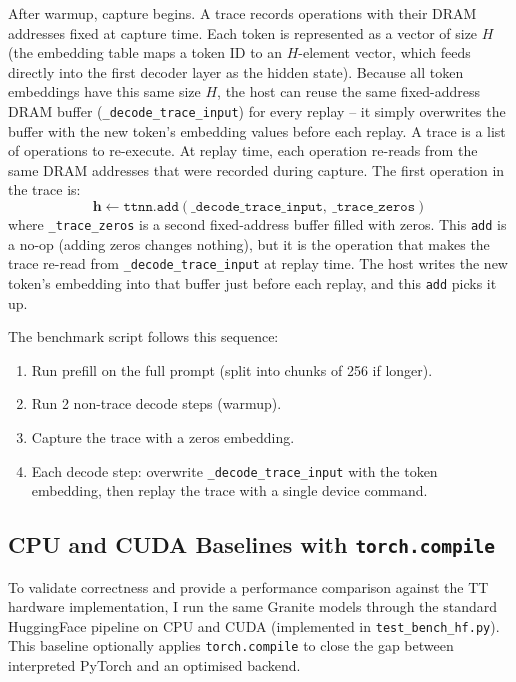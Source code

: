 After warmup, capture begins. A trace records operations with their DRAM addresses fixed at capture time. Each token is represented as a vector of size $H$ (the embedding table maps a token ID to an $H$-element vector, which feeds directly into the first decoder layer as the hidden state). Because all token embeddings have this same size $H$, the host can reuse the same fixed-address DRAM buffer (\texttt{\_decode\_trace\_input}) for every replay -- it simply overwrites the buffer with the new token's embedding values before each replay. A trace is a list of operations to re-execute. At replay time, each operation re-reads from the same DRAM addresses that were recorded during capture. The first operation in the trace is:
\begin{equation}
\mathbf{h} \leftarrow \mathtt{ttnn.add}(\mathtt{\_decode\_trace\_input},\ \mathtt{\_trace\_zeros})
\end{equation}
where \texttt{\_trace\_zeros} is a second fixed-address buffer filled with zeros. This \texttt{add} is a no-op (adding zeros changes nothing), but it is the operation that makes the trace re-read from \texttt{\_decode\_trace\_input} at replay time. The host writes the new token's embedding into that buffer just before each replay, and this \texttt{add} picks it up.

The benchmark script follows this sequence:
\begin{enumerate}
\item Run prefill on the full prompt (split into chunks of 256 if longer).
\item Run 2 non-trace decode steps (warmup).
\item Capture the trace with a zeros embedding.
\item Each decode step: overwrite \texttt{\_decode\_trace\_input} with the token embedding, then replay the trace with a single device command.
\end{enumerate}

\subsection{CPU and CUDA Baselines with \texttt{torch.compile}}

To validate correctness and provide a performance comparison against the TT hardware implementation, I run the same Granite models through the standard HuggingFace pipeline on CPU and CUDA (implemented in \texttt{test\_bench\_hf.py}). This baseline optionally applies \texttt{torch.compile} to close the gap between interpreted PyTorch and an optimised backend.


